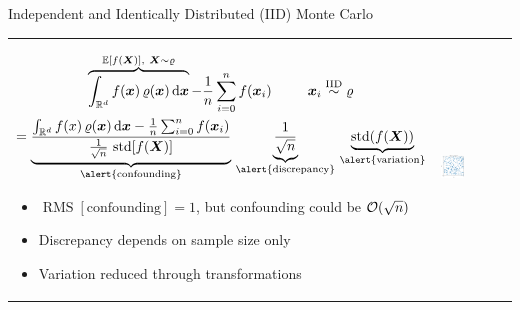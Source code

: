 \documentclass[10pt,compress,xcolor={usenames,dvipsnames},aspectratio=169]{beamer}
\DeclareMathOperator{\RMS}{RMS}
\begin{document}
\begin{frame}{Independent and Identically Distributed (IID) Monte Carlo}

	\vspace{-6ex}
	\hspace*{-2ex}
	\begin{tabular}{m{}m{}}
		\begin{multline*}\overbrace{\int_{\reals^d} f(\vx) \, \varrho(\vx) \, \dif \vx}^{\Ex[f(\vX)],\ \vX \sim \varrho} - \frac 1n \sum_{i=0}^n f(\vx_i) \hspace{6ex} \vx_i \IIDsim \varrho
			\\
			= \underbrace{\frac{\int_{\reals^d} f(x) \, \varrho(\vx) \, \dif \vx - \frac 1n \sum_{i=0}^n f(\vx_i)}{\frac 1{\sqrt{n}} \,
					\std[f(\vX)]}}_{\alert{\text{confounding}}}
			\, \underbrace{\frac{1}{\sqrt{n}}}_
			{\alert{\text{discrepancy}}} \,
			\underbrace{\std(f(\vX))}_{\alert{\text{variation}}}
		\end{multline*}
			\vspace{-2.5ex}
			\begin{itemize}
				\item $\RMS[\text{confounding}] = 1$, but confounding could be $\operatorname{{\mathcal O}}(\sqrt{n})$
				\item Discrepancy depends on sample size only
				\item Variation reduced through transformations
		\end{itemize}
		&
		\includegraphics[width=0.35\textwidth]{iidptssingle.eps}
	\end{tabular}
	\vspace{-2ex}

\end{frame}
\end{document}

